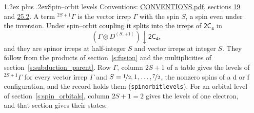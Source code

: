\documentclass[10pt,a4paper]{article}
\makeatletter
\renewcommand\section{\@startsection{section}{1}{\z@}{-3ex plus -1ex minus -.2ex}%
  {1.2ex plus .2ex}{\normalfont\large\sffamily\bfseries\color{parttitle}}}
\numberwithin{equation}{section}
\newcommand{\grp}[1]{\mathsf{#1}}
\newcommand{\restr}[2]{#1\!\downarrow#2}
\newcommand{\irrJp}[2]{D^{(#1,#2)}}
\newcommand{\irrprod}{\otimes}
\newcommand{\term}[2]{{}^{#1}#2}
\makeatother
\begin{document}
\section{Spin--orbit levels}\label{s:spin_orbit}
Conventions: \href{../../CONVENTIONS.pdf}{CONVENTIONS.pdf}, sections \href{../../../rotation/CONVENTIONS.pdf\#conv.19}{19} and \href{../../CONVENTIONS.pdf\#conv.25.2}{25.2}.
\leavevmode\label{n:local.spin}\label{n:symbol.term}A term $\term{2S+1}{\Gamma}$ is the vector irrep $\Gamma$ with the spin $S$, a spin even under the inversion. Under spin--orbit coupling it splits into the irreps of $\grp{2C_{4}}$ in
\begin{equation}\label{e:spinorbit}\restr{(\Gamma \irrprod \irrJp{S}{+1})}{\grp{2C_{4}}},\end{equation}
and they are spinor irreps at half-integer $S$ and vector irreps at integer $S$. They follow from the products of section~\ref{s:fusion} and the multiplicities of section~\ref{s:subduction_parent}. Row $\Gamma$, column $2S + 1$ of a table gives the levels of $\term{2S+1}{\Gamma}$ for every vector irrep $\Gamma$ and $S = \nicefrac{1}{2}, 1, \dots, \nicefrac{7}{2}$, the nonzero spins of a d or f configuration, and the record holds them (\texttt{spinorbitlevels}). For an orbital level of section~\ref{s:spin_orbitals}, column $2S + 1 = 2$ gives the levels of one electron, and that section gives their states.
\end{document}
